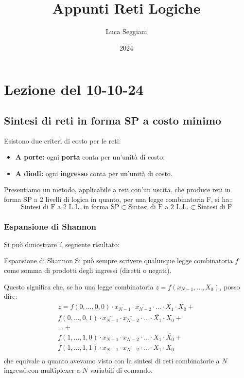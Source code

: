 \documentclass[a4paper,11pt]{article}
\title{Appunti Reti Logiche}
\author{Luca Seggiani}
\date{2024}
\begin{document}
\section{Lezione del 10-10-24}

\thispagestyle{empty}
\pagestyle{fancy}

\subsection{Sintesi di reti in forma SP a costo minimo}
Esistono due criteri di costo per le reti:
\begin{itemize}
	\item \textbf{A porte:} ogni \textbf{porta} conta per un'unità di costo;
	\item \textbf{A diodi:} ogni \textbf{ingresso} conta per un'unità di costo.
\end{itemize}

Presentiamo un metodo, applicabile a reti con'un uscita, che produce reti in forma SP a 2 livelli di logica in quanto, per una legge combinatoria F, si ha::
$$
\text{Sintesi di F a 2 L.L. in forma SP} \subset \text{Sintesi di F a 2 L.L.} \subset \text{Sintesi di F}
$$

\subsubsection{Espansione di Shannon}
Si può dimostrare il seguente risultato:
\begin{theorem}{Espansione di Shannon}
	Si può sempre scrivere qualunque legge combinatoria $f$ come somma di prodotti degli ingressi (diretti o negati).
\end{theorem}

Questo significa che, se ho una legge combinatoria $z = f(x_{N-1}, ..., X_0)$, posso dire:
\[
	\begin{aligned}
		z = f(0, ..., 0,  0) \cdot \overline{x_{N-1}} \cdot \overline{x_{N-2}} \cdot ... \cdot \overline{X_1} \cdot \overline{X_0}	+ \\
		f(0, ..., 0, 1) \cdot \overline{x_{N-1}} \cdot \overline{x_{N-2}} \cdot ... \cdot \overline{X_1} \cdot X_0	+\\
		... + \\
		f(1, ..., 1, 0) \cdot x_{N-1} \cdot x_{N-2} \cdot ... \cdot X_1 \cdot \overline{X_0}	+\\
		f(1, ..., 1, 1) \cdot x_{N-1} \cdot x_{N-2} \cdot ... \cdot X_1 \cdot X_0	\\
	\end{aligned}
\]
che equivale a quanto avevamo visto con la sintesi di reti combinatorie a $N$ ingressi con multiplexer a $N$ variabili di comando.
\end{document}
